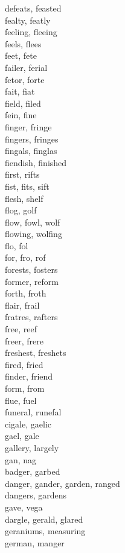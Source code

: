 defeats, feasted\\
fealty, featly\\
feeling, fleeing\\
feels, flees\\
feet, fete\\
failer, ferial\\
fetor, forte\\
fait, fiat\\
field, filed\\
fein, fine\\
finger, fringe\\
fingers, fringes\\
fingals, finglas\\
fiendish, finished\\
first, rifts\\
fist, fits, sift\\
flesh, shelf\\
flog, golf\\
flow, fowl, wolf\\
flowing, wolfing\\
flo, fol\\
for, fro, rof\\
forests, fosters\\
former, reform\\
forth, froth\\
flair, frail\\
fratres, rafters\\
free, reef\\
freer, frere\\
freshest, freshets\\
fired, fried\\
finder, friend\\
form, from\\
flue, fuel\\
funeral, runefal\\
cigale, gaelic\\
gael, gale\\
gallery, largely\\
gan, nag\\
badger, garbed\\
danger, gander, garden, ranged\\
dangers, gardens\\
gave, vega\\
dargle, gerald, glared\\
geraniums, measuring\\
german, manger\\
